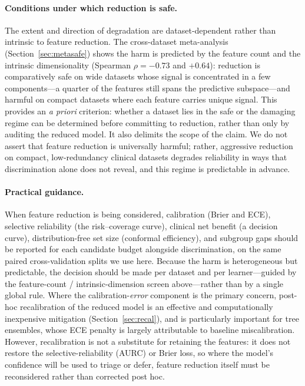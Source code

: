 \documentclass[fleqn,10pt]{wlscirep}
\begin{document}
\paragraph{Conditions under which reduction is safe.} The extent and direction of degradation are
dataset-dependent rather than intrinsic to feature reduction. The cross-dataset meta-analysis
(Section~\ref{sec:metasafe}) shows the harm is predicted by the feature count and the intrinsic
dimensionality (Spearman $\rho=-0.73$ and $+0.64$): reduction is comparatively safe on wide datasets
whose signal is concentrated in a few components---a quarter of the features still spans the predictive
subspace---and harmful on compact datasets where each feature carries unique signal. This provides an
\emph{a priori} criterion: whether a dataset lies in the safe or the damaging regime can be determined
before committing to reduction, rather than only by auditing the reduced model. It also delimits the
scope of the claim. We do not assert that feature reduction is universally harmful; rather, aggressive
reduction on compact, low-redundancy clinical datasets degrades reliability in ways that discrimination
alone does not reveal, and this regime is predictable in advance.

\paragraph{Practical guidance.} When feature reduction is being considered, calibration (Brier
and ECE), selective reliability (the risk--coverage curve), clinical net benefit (a decision curve),
distribution-free set size (conformal efficiency), and subgroup gaps should be reported
for each candidate budget alongside discrimination, on the same paired cross-validation splits we
use here. Because the harm is heterogeneous but predictable, the decision should be made per dataset
and per learner---guided by the feature-count / intrinsic-dimension screen above---rather than by a
single global rule. Where the calibration-\emph{error} component is the primary concern,
post-hoc recalibration of the reduced model is an effective and computationally inexpensive mitigation
(Section~\ref{sec:recal}), and is particularly important for tree ensembles, whose ECE penalty is
largely attributable to baseline miscalibration. However, recalibration is not a substitute for
retaining the features: it does not restore the selective-reliability (AURC) or Brier loss, so where the
model's confidence will be used to triage or defer, feature reduction itself must be reconsidered rather
than corrected post hoc.
\end{document}
